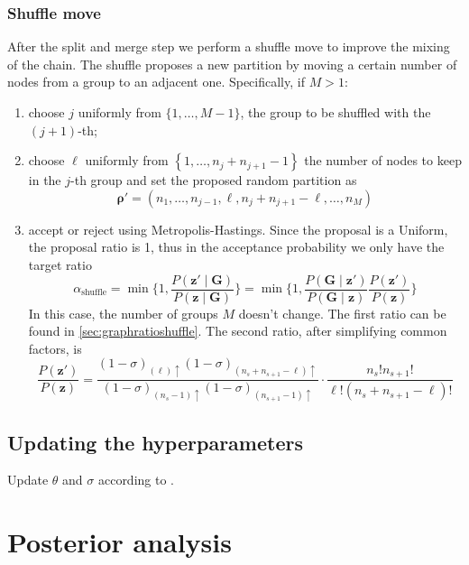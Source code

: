 \subsubsection{Shuffle move}

After the split and merge step we perform a shuffle move to improve the mixing of the chain.
The shuffle proposes a new partition by moving a certain number of nodes from a group to an adjacent one.
Specifically, if $M>1$:
\begin{enumerate}
    \item choose $j$ uniformly from $\{1, \ldots, M-1\}$, the group to be shuffled with the $(j+1)$-th;
    \item choose $\ell$ uniformly from $\left\{1, \ldots, n_j+n_{j+1}-1\right\}$ the number of nodes to keep in the $j$-th group and set the proposed random partition as
    \[
        \bm{\rho}'=\left(n_1, \ldots, n_{j-1}, \ell, n_j+n_{j+1}-\ell, \ldots, n_M\right)
    \]
    \item accept or reject using Metropolis-Hastings. Since the proposal is a Uniform, the proposal ratio is 1, thus in the acceptance probability we only have the target ratio
    \[
       \alpha_{\text{shuffle}}
       =
       \min
       \bigg\{1,
       \frac{P(\bm{z}'\mid \bm{G})}{P(\bm{z}\mid \bm{G})}
       \bigg\}
       =
       \min
       \bigg\{1,
       \frac{P(\bm{G}\mid \bm{z}')}{P(\bm{G}\mid \bm{z})}
       \frac{P(\bm{z}')}{P(\bm{z})}
       \bigg\}
    \]
    In this case, the number of groups $M$ doesn't change.
    The first ratio can be found in \ref{sec:graphratioshuffle}.
    The second ratio, after simplifying common factors, is
    \[
        \frac{P(\bm{z}')}{P(\bm{z})} = \frac{(1-\sigma)_{(\ell)\uparrow} (1-\sigma)_{(n_{s}+n_{s+1}-\ell)\uparrow}}{(1-\sigma)_{(n_{s}-1)\uparrow} (1-\sigma)_{(n_{s+1}-1)\uparrow}}
        \cdot \frac{n_{s}! n_{s+1}!}{\ell!(n_{s} + n_{s+1} - \ell)!}
    \]
    
\end{enumerate}

\subsection{Updating the hyperparameters}

Update $\theta$ and $\sigma$ according to \textcite[835-836]{martinezNonparametricChangePoint2014}.


\section{Posterior analysis}


